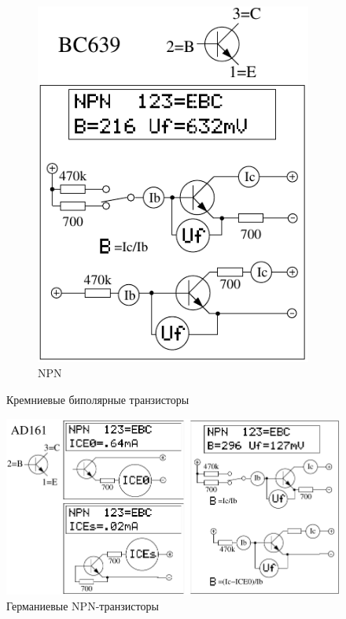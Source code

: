 \begin{figure}[H]
\begin{subfigure}[b]{.5\textwidth}
    \includegraphics[width=1.\textwidth]{../FIG/BJT_BC639.pdf}
    \caption{NPN}
    \label{fig:BJT-NPN}
  \end{subfigure}
  \caption{Кремниевые биполярные транзисторы}
\end{figure}


\begin{figure}[H]
\centering
\includegraphics[width=.8\textwidth]{../FIG/BJT_AD161.pdf}
\caption{Германиевые NPN-транзисторы}
\label{fig:BJT-NPN-Ge}
\end{figure}


